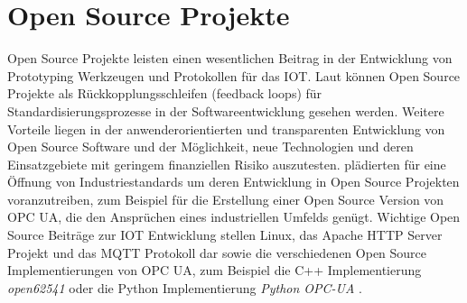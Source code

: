 \documentclass[BMR,Bachelor,ngerman]{twbook}%
\begin{document}
\section{Open Source Projekte}
Open Source Projekte leisten einen wesentlichen Beitrag in der Entwicklung von Prototyping Werkzeugen und Protokollen für das \ac{IOT}. Laut  können Open Source Projekte als Rückkopplungsschleifen (feedback loops) für Standardisierungsprozesse in der Softwareentwicklung gesehen werden. Weitere Vorteile liegen in der anwenderorientierten und transparenten Entwicklung von Open Source Software und der Möglichkeit, neue Technologien und deren Einsatzgebiete mit geringem finanziellen Risiko auszutesten.  plädierten für eine Öffnung von Industriestandards um deren Entwicklung in Open Source Projekten voranzutreiben, zum Beispiel für die Erstellung einer Open Source Version von \ac{OPC UA}, die den Ansprüchen eines industriellen Umfelds genügt. %
Wichtige Open Source Beiträge zur \ac{IOT} Entwicklung stellen Linux, das Apache HTTP Server Projekt \cite{apache} und das \ac{MQTT} Protokoll dar \cite{mqtt} sowie die verschiedenen Open Source Implementierungen von \ac{OPC UA}, zum Beispiel die C++ Implementierung \emph{open62541} \cite{open62541} oder die Python Implementierung \emph{Python OPC-UA} \cite{pythonopcua2018}.
%
%
\end{document}
